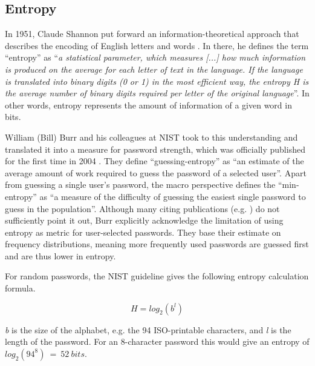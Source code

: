 	\subsection{Entropy}
	In 1951, Claude Shannon put forward an information-theoretical approach that describes the encoding of English letters and words \cite{Shannon1951Entropy}. In there, he defines the term ``entropy'' as ``\textit{a statistical parameter, which measures [...] how much information is produced on the average for each letter of text in the language. If the language is translated into binary digits (0 or 1) in the most efficient way, the entropy H is the average number of binary digits required per letter of the original language}''. In other words, entropy represents the amount of information of a given word in bits. 
	
	William (Bill) Burr and his colleagues at \gls{NIST} took to this understanding and translated it into a measure for password strength, which was officially published for the first time in 2004 \cite[Appendix A]{Burr2004NISTEntropy}. They define ``guessing-entropy'' as ``an estimate of the average amount of work required to guess the password of a selected user''. Apart from guessing a single user's password, the macro perspective defines the ``min-entropy'' as ``a measure of the difficulty of guessing the easiest single password to guess in the population''. Although many citing publications (e.g. \cite{Egelman2013DoesMyPasswordGoUpToEleven,Bonneau2012ScienceOfGuessing}) do not sufficiently point it out, Burr \etal explicitly acknowledge the limitation of using entropy as metric for user-selected passwords. They base their estimate on frequency distributions, meaning more frequently used passwords are guessed first and are thus lower in entropy. 
	
	For random passwords, the \gls{NIST} guideline gives the following entropy calculation formula. 
	
	$$ H = log_2(b^l)$$
	
	\textit{b} is the size of the alphabet, e.g. the 94 ISO-printable characters, and \textit{l} is the length of the password. For an 8-character password this would give an entropy of $log_2(94^8)~=~52~bits$. 
	
